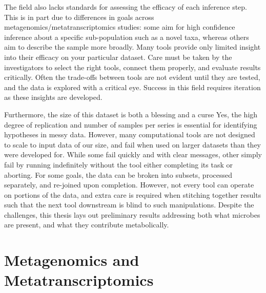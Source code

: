 The field also lacks standards for assessing the efficacy of each inference step.
This is in part due to differences in goals across metagenomics/metatranscriptomics studies: some aim for high confidence inference about a specific sub-population such as a novel taxa, whereas others aim to describe the sample more broadly.
Many tools provide only limited insight into their efficacy on your particular dataset.
Care must be taken by the investigators to select the right tools, connect them properly, and evaluate results critically.
Often the trade-offs between tools are not evident until they are tested, and the data is explored with a critical eye.
Success in this field requires iteration as these insights are developed.

Furthermore, the size of this dataset is both a blessing and a curse
Yes, the high degree of replication and number of samples per series is essential for identifying hypotheses in messy data.
However, many computational tools are not designed to scale to input data of our size, and fail when used on larger datasets than they were developed for.
While some fail quickly and with clear messages, other simply fail by running indefinitely without the tool either completing its task or aborting.
For some goals, the data can be broken into subsets, processed separately, and re-joined upon completion.
However, not every tool can operate on portions of the data, and extra care is required when stitching together results such that the next tool downstream is blind to such manipulations.
Despite the challenges, this thesis lays out preliminary results addressing both what microbes are present, and what they contribute metabolically.


\section{Metagenomics and Metatranscriptomics}




